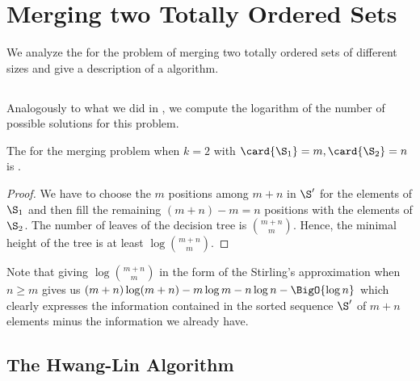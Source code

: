 \section{Merging two Totally Ordered Sets}
\label{tree:merging:k=2}

We analyze the \ITLB for the problem of merging two totally ordered sets of
different sizes and give a description of a \BigO{\ITLB} algorithm.

\subsection{\ITLB}
\label{tree:merging:k=2:ITLB}

Analogously to what we did in , we compute the
logarithm of the number of possible solutions for this problem.
\begin{theorem}
The \ITLB for the merging problem when \(k = 2\) with \(\card{\S_1} = m, \card{\S_2}
= n\) is .
\end{theorem}
\begin{proof}
We have to choose the $m$ positions among $m+n$ in $\S'$ for the elements of
$\S_1$ and then fill the remaining $(m+n) - m = n$ positions with the elements
of $\S_2$. The number of leaves of the decision tree is $\binom{m+n}{m}$.
Hence, the minimal height of the tree is at least $\log \binom{m+n}{m}$.
\end{proof}

Note that giving $\log \binom{m+n}{m}$ in the form of the Stirling's approximation
when \(n \ge m\) gives us $(m+n) \log(m+n) - m \log m - n \log n - \BigO{\log
n}$ which clearly expresses the information contained in the sorted sequence
$\S'$ of $m+n$ elements minus the information we already have.

\subsection{The Hwang-Lin Algorithm}
\label{tree:merging:k=2:alg}

